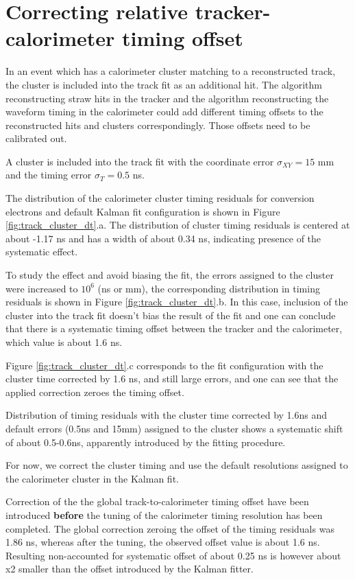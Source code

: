 \section{Correcting relative tracker-calorimeter timing offset}

In an event which has a calorimeter cluster matching to a reconstructed track, the
cluster is included into the track fit as an additional hit. The algorithm reconstructing 
straw hits in the tracker and the algorithm reconstructing the waveform timing in the calorimeter
could add different timing offsets to the reconstructed hits and clusters correspondingly.
Those offsets need to be calibrated out.

A cluster is included into the track fit with the coordinate error $\sigma_{XY} = 15$ mm
and the timing error $\sigma_T = 0.5$ ns.

The distribution of the calorimeter cluster timing residuals for conversion electrons and default Kalman fit 
configuration is shown in Figure \ref{fig:track_cluster_dt}.a. The distribution of cluster timing residuals 
is centered at about -1.17 ns and has a width of about 0.34 ns, indicating presence of the systematic effect.

To study the effect and avoid biasing the fit, the errors assigned to the cluster were increased to $10^6$ (ns or mm),
the corresponding distribution in timing residuals is shown in Figure \ref{fig:track_cluster_dt}.b. 
In this case, inclusion of the cluster into the track fit doesn't bias the result of the fit and one can conclude 
that there is a systematic timing offset between the tracker and the calorimeter, which value is about 1.6 ns.

Figure \ref{fig:track_cluster_dt}.c corresponds to the fit configuration with the cluster time corrected by 1.6 ns, 
and still large errors, and one can see that the applied correction zeroes the timing offset.

Distribution of timing residuals with the cluster time corrected by 1.6ns and default errors (0.5ns and 15mm) 
assigned to the cluster shows a systematic shift of about 0.5-0.6ns, apparently introduced by the fitting procedure.

For now, we correct the cluster timing and use the default resolutions assigned to the calorimeter cluster 
in the Kalman fit.

Correction of the the global track-to-calorimeter timing offset have been introduced {\bf before} 
the tuning of the calorimeter timing resolution has been completed. The global correction zeroing the offset
of the timing residuals was 1.86 ns, whereas after the tuning, the observed offset value is about 1.6 ns.
Resulting non-accounted for systematic offset of about 0.25 ns is however about x2 smaller than the offset
introduced by the Kalman fitter.

